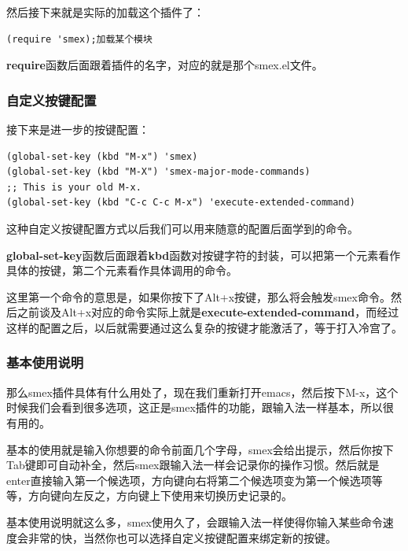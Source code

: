 \documentclass[11pt,oneside]{book}
\begin{document}
然后接下来就是实际的加载这个插件了：
\begin{Verbatim}
(require 'smex);加载某个模块
\end{Verbatim}
\textbf{require}函数后面跟着插件的名字，对应的就是那个smex.el文件。

\subsubsection{自定义按键配置}
接下来是进一步的按键配置：
\begin{Verbatim}
(global-set-key (kbd "M-x") 'smex)
(global-set-key (kbd "M-X") 'smex-major-mode-commands)
;; This is your old M-x.
(global-set-key (kbd "C-c C-c M-x") 'execute-extended-command)
\end{Verbatim}
这种自定义按键配置方式以后我们可以用来随意的配置后面学到的命令。

\textbf{global-set-key}函数后面跟着\textbf{kbd}函数对按键字符的封装，可以把第一个元素看作具体的按键，第二个元素看作具体调用的命令。

这里第一个命令的意思是，如果你按下了Alt+x按键，那么将会触发smex命令。然后之前谈及Alt+x对应的命令实际上就是\textbf{execute-extended-command}，而经过这样的配置之后，以后就需要通过这么复杂的按键才能激活了，等于打入冷宫了。


\subsubsection{基本使用说明}
那么smex插件具体有什么用处了，现在我们重新打开emacs，然后按下M-x，这个时候我们会看到很多选项，这正是smex插件的功能，跟输入法一样基本，所以很有用的。

基本的使用就是输入你想要的命令前面几个字母，smex会给出提示，然后你按下Tab键即可自动补全，然后smex跟输入法一样会记录你的操作习惯。然后就是enter直接输入第一个候选项，方向键向右将第二个候选项变为第一个候选项等等，方向键向左反之，方向键上下使用来切换历史记录的。

基本使用说明就这么多，smex使用久了，会跟输入法一样使得你输入某些命令速度会非常的快，当然你也可以选择自定义按键配置来绑定新的按键。
\end{document}
